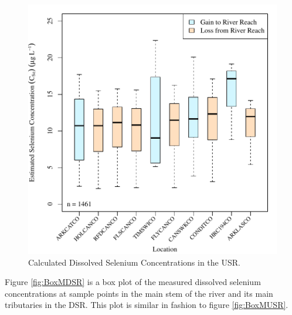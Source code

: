\begin{linenumbers}
\begin{figure}[htbp]
\centering
	\includegraphics[width=6in]{"Figures/Results_USR/Stochastic/c BOX Estimated CSe"}
	\caption[Calculated Dissolved Selenium Concentrations in the USR.]{Calculated Dissolved Selenium Concentrations in the USR.}
	\label{fig:BoxCUSR}
\end{figure}

Figure \ref{fig:BoxMDSR} is a box plot of the measured dissolved selenium concentrations at sample points in the main stem of the river and its main tributaries in the DSR.  This plot is similar in fashion to figure \ref{fig:BoxMUSR}.


\end{linenumbers}
